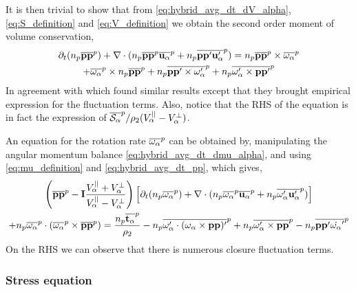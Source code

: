 It is then trivial to show that from \ref{eq:hybrid_avg_dt_dV_alpha},\ref{eq:S_definition} and \ref{eq:V_definition} we obtain the second order moment of volume conservation,
\begin{multline}
    \partial_t (n_p\overline{\textbf{pp}}^{p})
    + \mathbf{\nabla} \cdot (
        n_p\overline{\textbf{pp}}^{p}\overline{\textbf{u}_\alpha}^{p}
        + n_p\overline{\textbf{pp}'\textbf{u}_\alpha'}^{p}
        )
    = 
    n_p\overline{\textbf{pp}}^{p} \times \overline{\omega_\alpha}^{p}\\
    + \overline{\omega_\alpha}^{p} \times n_p\overline{\textbf{pp}}^{p} 
    + n_p\overline{\textbf{pp}' \times \omega_\alpha'}^{p}
    +n_p\overline{\omega_\alpha' \times \textbf{pp}'}^{p}
    \label{eq:hybrid_avg_dt_pp}
\end{multline}
In agreement with \citet{advani1987use} which found similar results except that they brought empirical expression for the fluctuation terms. 
Also, notice that the RHS of the equation is in fact the expression of $\overline{\mathcal{S}_\alpha}^{p} /{ \rho_2 (V_\alpha^{||} - V_\alpha^\bot)}$.

An equation for the rotation rate $\overline{\omega_\alpha}^{p}$ can be obtained by, manipulating the angular momentum balance  \ref{eq:hybrid_avg_dt_dmu_alpha}, and using \ref{eq:mu_definition} and \ref{eq:hybrid_avg_dt_pp}, which gives,
\begin{multline}
    \left(
        \overline{\textbf{pp}}^{p} 
        - \textbf{I}\frac{V_\alpha^{||} + V_\alpha^\bot}{V_\alpha^{||} - V_\alpha^\bot}
    \right)\left[
        \partial_t (n_p\overline{\omega_\alpha}^{p})
        + \mathbf{\nabla} \cdot (
            n_p\overline{\omega_\alpha}^{p}\overline{\textbf{u}_\alpha}^{p}
            + n_p\overline{\omega_\alpha'\textbf{u}_\alpha'}^{p})
        \right]\\
    +  n_p\overline{\omega_\alpha}^{p}
    \cdot(\overline{\omega_\alpha}^{p} 
    \times \overline{\textbf{pp}}^{p})
    = \frac{n_p\overline{\textbf{t}_\alpha}^{p}}{\rho_2}
    -n_p\overline{\omega_\alpha' \cdot (\omega_\alpha \times \textbf{pp})'}^{p}
    +n_p\overline{\omega_\alpha' \times \textbf{pp}}^{p}
    - n_p\overline{\textbf{pp}'\dot{ \omega_\alpha}'}^{p}
\end{multline}
On the RHS we can observe that there is numerous closure fluctuation terms.  
\subsubsection*{Stress equation}

